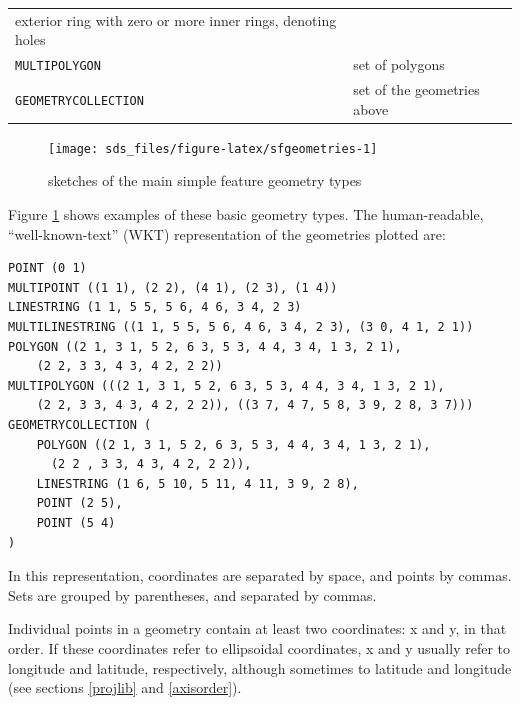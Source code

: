 \documentclass[]{book}
\begin{document}
\begin{longtable}[]{@{}ll@{}}
\begin{minipage}[t]{0.69\columnwidth}
exterior ring with zero or more inner rings, denoting holes\strut
\end{minipage}\tabularnewline
\begin{minipage}[t]{0.25\columnwidth}\raggedright
\texttt{MULTIPOLYGON}\strut
\end{minipage} & \begin{minipage}[t]{0.69\columnwidth}\raggedright
set of polygons\strut
\end{minipage}\tabularnewline
\begin{minipage}[t]{0.25\columnwidth}\raggedright
\texttt{GEOMETRYCOLLECTION}\strut
\end{minipage} & \begin{minipage}[t]{0.69\columnwidth}\raggedright
set of the geometries above\strut
\end{minipage}\tabularnewline
\bottomrule
\end{longtable}

\begin{figure}

{\centering \texttt{[image: sds\_files/figure-latex/sfgeometries-1]} 

}

\caption{sketches of the main simple feature geometry types}\label{fig:sfgeometries}
\end{figure}

Figure \ref{fig:sfgeometries} shows examples of these basic
geometry types. The human-readable, ``well-known-text'' (WKT) representation
of the geometries plotted are:

\begin{verbatim}
POINT (0 1)
MULTIPOINT ((1 1), (2 2), (4 1), (2 3), (1 4))
LINESTRING (1 1, 5 5, 5 6, 4 6, 3 4, 2 3)
MULTILINESTRING ((1 1, 5 5, 5 6, 4 6, 3 4, 2 3), (3 0, 4 1, 2 1))
POLYGON ((2 1, 3 1, 5 2, 6 3, 5 3, 4 4, 3 4, 1 3, 2 1),
    (2 2, 3 3, 4 3, 4 2, 2 2))
MULTIPOLYGON (((2 1, 3 1, 5 2, 6 3, 5 3, 4 4, 3 4, 1 3, 2 1),
    (2 2, 3 3, 4 3, 4 2, 2 2)), ((3 7, 4 7, 5 8, 3 9, 2 8, 3 7)))
GEOMETRYCOLLECTION (
    POLYGON ((2 1, 3 1, 5 2, 6 3, 5 3, 4 4, 3 4, 1 3, 2 1),
      (2 2 , 3 3, 4 3, 4 2, 2 2)),
    LINESTRING (1 6, 5 10, 5 11, 4 11, 3 9, 2 8),
    POINT (2 5),
    POINT (5 4)
)
\end{verbatim}

In this representation, coordinates are separated by space, and
points by commas. Sets are grouped by parentheses, and separated
by commas.

Individual points in a geometry contain at least two coordinates:
x and y, in that order. If these coordinates refer to ellipsoidal
coordinates, x and y usually refer to longitude and latitude,
respectively, although sometimes to latitude and longitude (see
sections \ref{projlib} and \ref{axisorder}).
\end{document}
